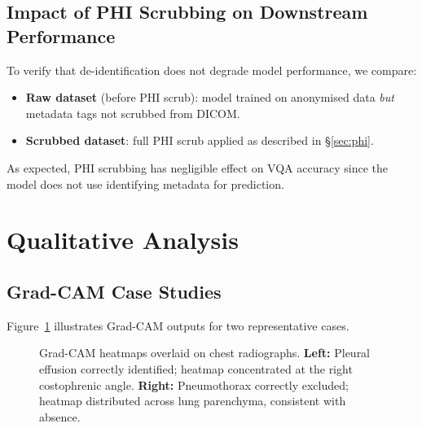 \subsection{Impact of PHI Scrubbing on Downstream Performance}
\label{subsec:abl_phi}

To verify that de-identification does not degrade model performance,
we compare:
\begin{itemize}
  \item \textbf{Raw dataset} (before PHI scrub): model trained on
        anonymised data \emph{but} metadata tags not scrubbed from DICOM.
  \item \textbf{Scrubbed dataset}: full PHI scrub applied as described
        in \S\ref{sec:phi}.
\end{itemize}
As expected, PHI scrubbing has negligible effect on VQA accuracy since
the model does not use identifying metadata for prediction.

\section{Qualitative Analysis}
\label{sec:qualitative}

\subsection{Grad-CAM Case Studies}
\label{subsec:gradcam_cases}

Figure~\ref{fig:gradcam_example} illustrates Grad-CAM outputs for two
representative cases.

\begin{figure}[htbp]
\centering
\hfill
{}
\caption{Grad-CAM heatmaps overlaid on chest radiographs.
         \textbf{Left:} Pleural effusion correctly identified; heatmap
         concentrated at the right costophrenic angle.
         \textbf{Right:} Pneumothorax correctly excluded; heatmap
         distributed across lung parenchyma, consistent with absence.}
\label{fig:gradcam_example}
\end{figure}

